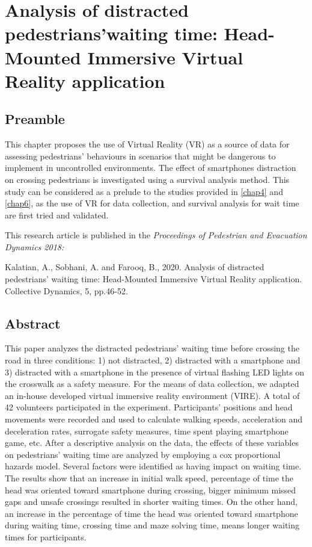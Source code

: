 \chapter{Analysis of distracted pedestrians’waiting time: Head-Mounted Immersive Virtual Reality application}
\label{chap3}
\thispagestyle{empty}

\section*{Preamble}
This chapter proposes the use of Virtual Reality (VR) as a source of data for assessing pedestrians' behaviours in scenarios that might be dangerous to implement in uncontrolled environments. The effect of smartphones distraction on crossing pedestrians is investigated using a survival analysis method. This study can be considered as a prelude to the studies provided in \cref{chap4} and \cref{chap6}, as the use of VR for data collection, and survival analysis for wait time are first tried and validated.

\vspace{1em} 
\noindent
This research article is published in the \textit{Proceedings of Pedestrian and Evacuation Dynamics 2018:}

\vspace{1em}
\noindent
Kalatian, A., Sobhani, A. and Farooq, B., 2020. Analysis of distracted pedestrians’ waiting time: Head-Mounted Immersive Virtual Reality application. Collective Dynamics, 5, pp.46-52.
\clearpage

\section*{Abstract}
This paper analyzes the distracted pedestrians’ waiting time before crossing the road in three conditions: 1) not distracted, 2) distracted with a smartphone and 3) distracted with a smartphone in the presence of virtual flashing LED lights on the crosswalk as a safety measure. For the means of data collection, we adapted an in-house developed virtual immersive reality environment (VIRE). A total of 42 volunteers participated in the experiment. Participants’ positions and head movements were recorded and used to calculate walking speeds, acceleration and deceleration rates, surrogate safety measures, time spent playing smartphone game, etc. After a descriptive analysis on the data, the effects of these variables on pedestrians’ waiting time are analyzed by employing a cox proportional hazards model. Several factors were identified as having impact on waiting time. The results show that an increase in initial walk speed, percentage of time the head was oriented toward smartphone during crossing, bigger minimum missed gaps and unsafe crossings resulted in shorter waiting times. On the other hand, an increase in the percentage of time the head was oriented toward smartphone during waiting time, crossing time and maze solving time, means longer waiting times for participants.
\clearpage













